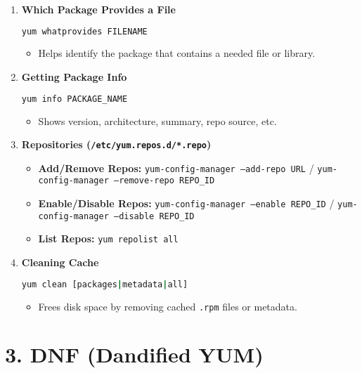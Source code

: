 \documentclass[12pt,a4paper]{report}
\begin{document}
\begin{enumerate}
    \item \textbf{Which Package Provides a File}
    \begin{lstlisting}[language=bash]
yum whatprovides FILENAME
    \end{lstlisting}
    \begin{itemize}
        \item Helps identify the package that contains a needed file or library.
    \end{itemize}

    \item \textbf{Getting Package Info}
    \begin{lstlisting}[language=bash]
yum info PACKAGE_NAME
    \end{lstlisting}
    \begin{itemize}
        \item Shows version, architecture, summary, repo source, etc.
    \end{itemize}

    \item \textbf{Repositories (\texttt{/etc/yum.repos.d/*.repo})}
    \begin{itemize}
        \item \textbf{Add/Remove Repos:} \texttt{yum-config-manager --add-repo URL} / \texttt{yum-config-manager --remove-repo REPO\_ID}
        \item \textbf{Enable/Disable Repos:} \texttt{yum-config-manager --enable REPO\_ID} / \texttt{yum-config-manager --disable REPO\_ID}
        \item \textbf{List Repos:} \texttt{yum repolist all}
    \end{itemize}

    \item \textbf{Cleaning Cache}
    \begin{lstlisting}[language=bash]
yum clean [packages|metadata|all]
    \end{lstlisting}
    \begin{itemize}
        \item Frees disk space by removing cached \texttt{.rpm} files or metadata.
    \end{itemize}
\end{enumerate}

\section*{3. DNF (Dandified YUM)}
\end{document}

